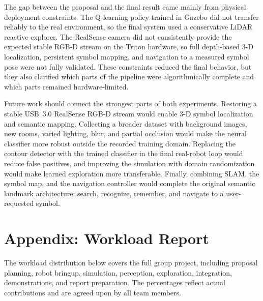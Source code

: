 \documentclass[letterpaper, 10 pt, conference]{ieeeconf/ieeeconf}
\begin{document}
The gap between the proposal and the final result came mainly from physical
deployment constraints.
The Q-learning policy trained in Gazebo did not transfer reliably to the real
environment, so the final system used a conservative LiDAR reactive explorer.
The RealSense camera did not consistently provide the expected stable RGB-D
stream on the Triton hardware, so full depth-based 3-D localization, persistent
symbol mapping, and navigation to a measured symbol pose were not fully
validated.
These constraints reduced the final behavior, but they also clarified which
parts of the pipeline were algorithmically complete and which parts remained
hardware-limited.

Future work should connect the strongest parts of both experiments.
Restoring a stable USB~3.0 RealSense RGB-D stream would enable 3-D symbol
localization and semantic mapping.
Collecting a broader dataset with background images, new rooms, varied
lighting, blur, and partial occlusion would make the neural classifier more
robust outside the recorded training domain.
Replacing the contour detector with the trained classifier in the final
real-robot loop would reduce false positives, and improving the simulation
with domain randomization would make learned exploration more transferable.
Finally, combining SLAM, the symbol map, and the navigation controller would
complete the original semantic landmark architecture: search, recognize,
remember, and navigate to a user-requested symbol.

\appendix
\section*{Appendix: Workload Report}

The workload distribution below covers the full group project, including
proposal planning, robot bringup, simulation, perception, exploration,
integration, demonstrations, and report preparation.
The percentages reflect actual contributions and are agreed upon by all
team members.
\end{document}
